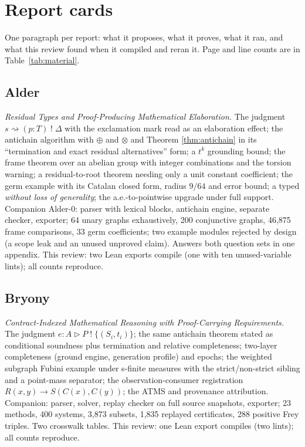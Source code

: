 \section{Report cards}\label{app:cards}
One paragraph per report: what it proposes, what it proves, what it ran, and what this review found when it compiled and reran it. Page and line counts are in Table~\ref{tab:material}.

\subsection*{Alder}
\emph{Residual Types and Proof-Producing Mathematical Elaboration.} The judgment $s\rightsquigarrow(p:T)\;!\;\Delta$ with the exclamation mark read as an elaboration effect; the antichain algorithm with $\oplus$ and $\otimes$ and Theorem \ref{thm:antichain} in its ``termination and exact residual alternatives'' form; a $t^k$ grounding bound; the frame theorem over an abelian group with integer combinations and the torsion warning; a residual-to-root theorem needing only a unit constant coefficient; the germ example with its Catalan closed form, radius $9/64$ and error bound; a typed \emph{without loss of generality}; the a.e.-to-pointwise upgrade under full support. Companion Alder-0: parser with lexical blocks, antichain engine, separate checker, exporter; 64 unary graphs exhaustively, 200 conjunctive graphs, 46,875 frame comparisons, 33 germ coefficients; two example modules rejected by design (a scope leak and an unused unproved claim). Answers both question sets in one appendix. This review: two Lean exports compile (one with ten unused-variable lints); all counts reproduce.

\subsection*{Bryony}
\emph{Contract-Indexed Mathematical Reasoning with Proof-Carrying Requirements.} The judgment $e:A\triangleright P\;!\;\{(S_i,t_i)\}$; the same antichain theorem stated as conditional soundness plus termination and relative completeness; two-layer completeness (ground engine, generation profile) and epochs; the weighted subgraph Fubini example under s-finite measures with the strict/non-strict sibling and a point-mass separator; the observation-consumer registration $R(x,y)\to S(C(x),C(y))$; the ATMS and provenance attribution. Companion: parser, solver, replay checker on full source snapshots, exporter; 23 methods, 400 systems, 3,873 subsets, 1,835 replayed certificates, 288 positive Frey triples. Two crosswalk tables. This review: one Lean export compiles (two lints); all counts reproduce.


